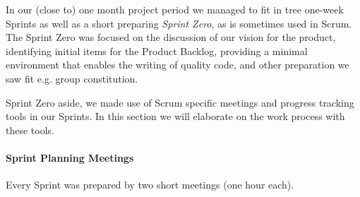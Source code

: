 In our (close to) one month project period we managed to fit in tree one-week Sprints as well as a short preparing \textit{Sprint Zero}, as is sometimes used in Scrum. The Sprint Zero was focused on the discussion of our vision for the product, identifying initial items for the Product Backlog, providing a minimal environment that enables the  writing of quality code, and other preparation we saw fit e.g. group constitution.

Sprint Zero aside, we made use of Scrum specific meetings and progress tracking tools in our Sprints. In this section we will elaborate on the work process with these tools.


\paragraph{Sprint Planning Meetings} 
Every Sprint was prepared by two short meetings (one hour each).